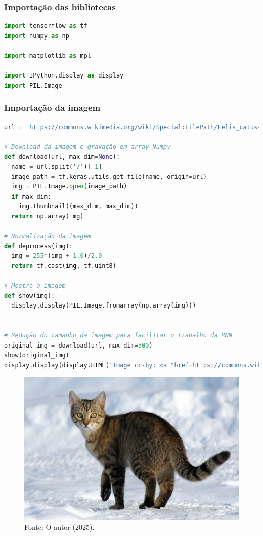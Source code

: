 \subsubsection*{Importação das bibliotecas}
\begin{lstlisting}[language=Python, style=input]
import tensorflow as tf
import numpy as np

import matplotlib as mpl

import IPython.display as display
import PIL.Image
\end{lstlisting}
\subsubsection*{Importação da imagem}
\begin{lstlisting}[language=Python, style=input]
url = "https://commons.wikimedia.org/wiki/Special:FilePath/Felis_catus-cat_on_snow.jpg"

# Download da imagem e gravação em array Numpy
def download(url, max_dim=None):
  name = url.split('/')[-1]
  image_path = tf.keras.utils.get_file(name, origin=url)
  img = PIL.Image.open(image_path)
  if max_dim:
    img.thumbnail((max_dim, max_dim))
  return np.array(img)

# Normalização da imagem
def deprocess(img):
  img = 255*(img + 1.0)/2.0
  return tf.cast(img, tf.uint8)

# Mostra a imagem
def show(img):
  display.display(PIL.Image.fromarray(np.array(img)))


# Redução do tamanho da imagem para facilitar o trabalho da RNN
original_img = download(url, max_dim=500)
show(original_img)
display.display(display.HTML('Image cc-by: <a "href=https://commons.wikimedia.org/wiki/File:Felis_catus-cat_on_snow.jpg">Von.grzanka</a>'))
\end{lstlisting}
\begin{figure}[H]
\centering
\caption{Imagem escolhida - Deepdream}
\includegraphics[width=.8\linewidth]{apendices/fig/13_IAA012_11.png}
\caption*{Fonte: O autor (2025).}
\end{figure}

